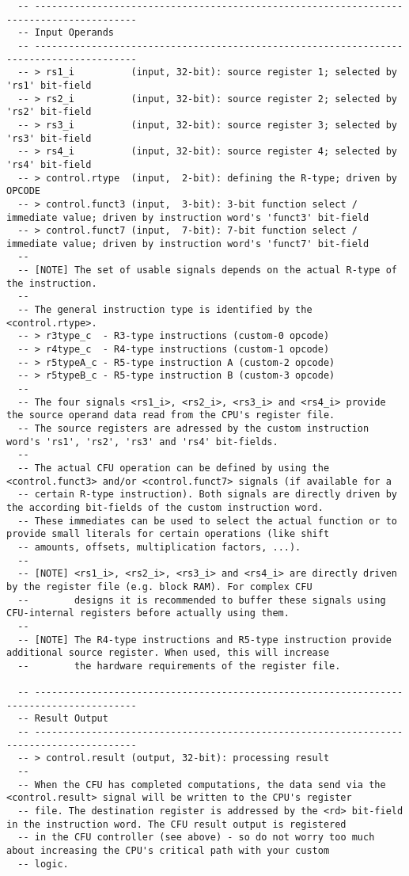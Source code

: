 \begin{code}
\begin{verbatim}
  -- ----------------------------------------------------------------------------------------
  -- Input Operands
  -- ----------------------------------------------------------------------------------------
  -- > rs1_i          (input, 32-bit): source register 1; selected by 'rs1' bit-field
  -- > rs2_i          (input, 32-bit): source register 2; selected by 'rs2' bit-field
  -- > rs3_i          (input, 32-bit): source register 3; selected by 'rs3' bit-field
  -- > rs4_i          (input, 32-bit): source register 4; selected by 'rs4' bit-field
  -- > control.rtype  (input,  2-bit): defining the R-type; driven by OPCODE
  -- > control.funct3 (input,  3-bit): 3-bit function select / immediate value; driven by instruction word's 'funct3' bit-field
  -- > control.funct7 (input,  7-bit): 7-bit function select / immediate value; driven by instruction word's 'funct7' bit-field
  --
  -- [NOTE] The set of usable signals depends on the actual R-type of the instruction.
  --
  -- The general instruction type is identified by the <control.rtype>.
  -- > r3type_c  - R3-type instructions (custom-0 opcode)
  -- > r4type_c  - R4-type instructions (custom-1 opcode)
  -- > r5typeA_c - R5-type instruction A (custom-2 opcode)
  -- > r5typeB_c - R5-type instruction B (custom-3 opcode)
  --
  -- The four signals <rs1_i>, <rs2_i>, <rs3_i> and <rs4_i> provide the source operand data read from the CPU's register file.
  -- The source registers are adressed by the custom instruction word's 'rs1', 'rs2', 'rs3' and 'rs4' bit-fields.
  --
  -- The actual CFU operation can be defined by using the <control.funct3> and/or <control.funct7> signals (if available for a
  -- certain R-type instruction). Both signals are directly driven by the according bit-fields of the custom instruction word.
  -- These immediates can be used to select the actual function or to provide small literals for certain operations (like shift
  -- amounts, offsets, multiplication factors, ...).
  --
  -- [NOTE] <rs1_i>, <rs2_i>, <rs3_i> and <rs4_i> are directly driven by the register file (e.g. block RAM). For complex CFU
  --        designs it is recommended to buffer these signals using CFU-internal registers before actually using them.
  --
  -- [NOTE] The R4-type instructions and R5-type instruction provide additional source register. When used, this will increase
  --        the hardware requirements of the register file.

  -- ----------------------------------------------------------------------------------------
  -- Result Output
  -- ----------------------------------------------------------------------------------------
  -- > control.result (output, 32-bit): processing result
  --
  -- When the CFU has completed computations, the data send via the <control.result> signal will be written to the CPU's register
  -- file. The destination register is addressed by the <rd> bit-field in the instruction word. The CFU result output is registered
  -- in the CFU controller (see above) - so do not worry too much about increasing the CPU's critical path with your custom
  -- logic.


\end{verbatim}
\end{code}
